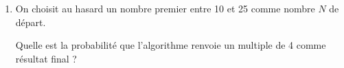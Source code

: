 \documentclass[exercice,a4]{thedocument}%
\begin{document}
\begin{enumerate}
\begin{enumerate}
		ligne 3 : si réponse $> \ldots$  alors
		\item Recopier la ligne 6 en complétant les pointillés:

		ligne 6 : dire \ldots $*(\ldots  + \ldots)$ pendant 2 secondes
	\end{enumerate}
\item On choisit au hasard un nombre premier entre 10 et 25 comme nombre $N$ de départ.

Quelle est la probabilité que l'algorithme renvoie un multiple de 4 comme résultat final ?
\end{enumerate}

\bigskip

\showthesource
\end{document}

